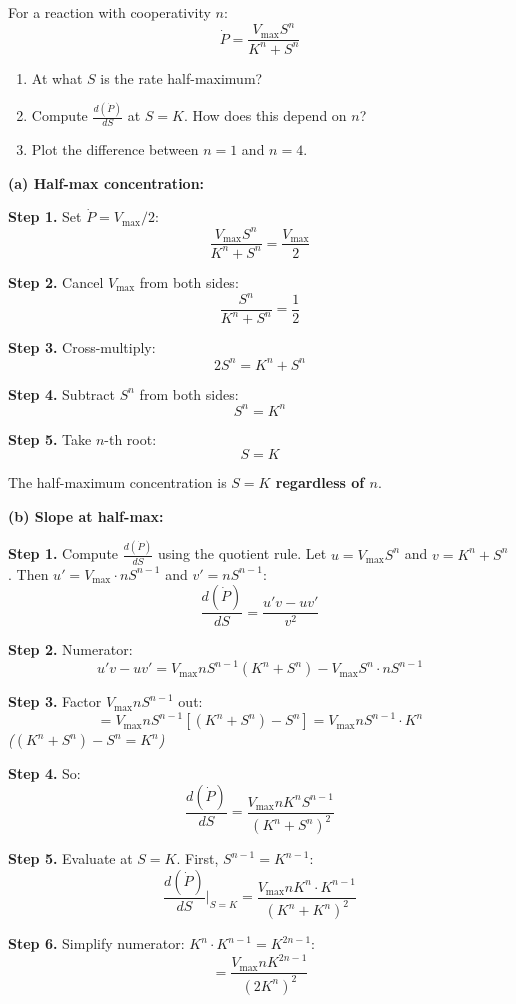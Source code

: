 \documentclass[10pt]{article}
\newcommand{\stepwhy}[1]{\textcolor{blue!60!black}{\small\textit{(#1)}}}
\begin{document}
\begin{problem}
For a reaction with cooperativity $n$:
\[
\dot P = \frac{V_\text{max} S^n}{K^n + S^n}
\]
\begin{enumerate}[label=(\alph*)]
\item At what $S$ is the rate half-maximum?
\item Compute $\frac{d(\dot P)}{dS}$ at $S = K$. How does this depend on $n$?
\item Plot the difference between $n = 1$ and $n = 4$.
\end{enumerate}
\end{problem}

\begin{solution}
\textbf{(a) Half-max concentration:}

\textbf{Step 1.} Set $\dot P = V_{\max}/2$:
\[
\frac{V_{\max} S^n}{K^n + S^n} = \frac{V_{\max}}{2}
\]

\textbf{Step 2.} Cancel $V_{\max}$ from both sides:
\[
\frac{S^n}{K^n + S^n} = \frac{1}{2}
\]

\textbf{Step 3.} Cross-multiply:
\[
2S^n = K^n + S^n
\]

\textbf{Step 4.} Subtract $S^n$ from both sides:
\[
S^n = K^n
\]

\textbf{Step 5.} Take $n$-th root:
\[
S = K
\]

The half-maximum concentration is \textbf{$S = K$ regardless of $n$}.

\medskip\textbf{(b) Slope at half-max:}

\textbf{Step 1.} Compute $\frac{d(\dot P)}{dS}$ using the quotient rule. Let $u = V_{\max}S^n$ and $v = K^n + S^n$. Then $u' = V_{\max}\cdot nS^{n-1}$ and $v' = nS^{n-1}$:
\[
\frac{d(\dot P)}{dS} = \frac{u'v - uv'}{v^2}
\]

\textbf{Step 2.} Numerator:
\[
u'v - uv' = V_{\max}nS^{n-1}(K^n + S^n) - V_{\max}S^n\cdot nS^{n-1}
\]

\textbf{Step 3.} Factor $V_{\max}nS^{n-1}$ out:
\[
= V_{\max}nS^{n-1}[(K^n + S^n) - S^n] = V_{\max}nS^{n-1}\cdot K^n
\]
\stepwhy{$(K^n + S^n) - S^n = K^n$}

\textbf{Step 4.} So:
\[
\frac{d(\dot P)}{dS} = \frac{V_{\max}nK^n S^{n-1}}{(K^n + S^n)^2}
\]

\textbf{Step 5.} Evaluate at $S = K$. First, $S^{n-1} = K^{n-1}$:
\[
\frac{d(\dot P)}{dS}\bigg|_{S=K} = \frac{V_{\max}nK^n\cdot K^{n-1}}{(K^n + K^n)^2}
\]

\textbf{Step 6.} Simplify numerator: $K^n\cdot K^{n-1} = K^{2n-1}$:
\[
= \frac{V_{\max}n K^{2n-1}}{(2K^n)^2}
\]


\end{solution}
\end{document}
